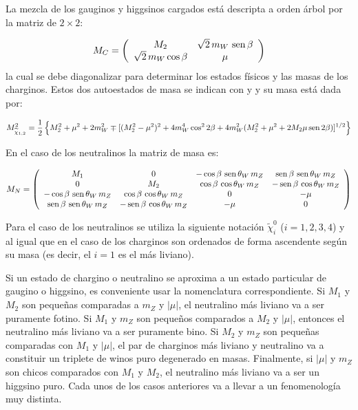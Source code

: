 \begin{itemize}
La mezcla de los gauginos y higgsinos cargados está descripta a orden árbol por la matriz de $2\times 2$:

\begin{equation}
  M_{C} = \left(
  \begin{array}{cc}
      M_2               & {\sqrt{2}} \, m_{W} \, \operatorname{sen} \beta  \\
      \sqrt{2} \, m_W \cos \beta  & \mu
  \end{array}
  \right)
\end{equation}
%
la cual se debe diagonalizar para determinar los estados físicos y las masas de los charginos.
Estos dos autoestados de masa se indican con {\chinoonepm} y
{\chinotwopm} y su masa está dada por:

\begin{equation}
  M^2_{\widetilde{\chi}_{1,2}} = \frac{1}{2} \left\{ M_2^2 + \mu^2 + 2 m_W^2 \mp
  [(M_2^2-\mu^2)^2 + 4 m_W^4 \cos^2 2\beta + 4 m_W^2 (M_2^2+\mu^2 + 2 M_2 \mu \operatorname{sen}
    2\beta)]^{1/2} \right\}
\end{equation}


En el caso de los neutralinos la matriz de masa es:

\begin{equation}
  M_{N} = \left(
  \begin{array}{cccc}
    M_1 & 0 & - \cos\beta \, \operatorname{sen}\theta_W \, m_Z & \operatorname{sen}\beta \, \operatorname{sen}\theta_W \, m_Z \\
    0 & M_2 & \cos\beta \, \cos\theta_W \, m_Z & -\operatorname{sen}\beta \, \cos\theta_W \, m_Z \\
    - \cos\beta \, \operatorname{sen}\theta_W \, m_Z & \cos\beta \, \cos\theta_W  \,m_Z & 0 & -\mu \\
    \operatorname{sen}\beta \, \operatorname{sen}\theta_W \, m_Z & -\operatorname{sen}\beta \, \cos\theta_W \, m_Z & -\mu & 0 \\
  \end{array}
  \right)
\end{equation}

Para el caso de los neutralinos se utiliza la siguiente notación $\tilde{\chi}^0_{i}$ ($i=1,2,3,4$)
y al igual que en el caso de los charginos son ordenados de forma ascendente según su masa (es decir,
el $i=1$ es el más liviano).

Si un estado de chargino o neutralino se aproxima a un estado particular de
gaugino o higgsino, es conveniente usar la nomenclatura correspondiente. Si
$M_1$ y $M_2$ son pequeñas comparadas a $m_Z$ y $|\mu|$, el neutralino más
liviano va a ser puramente fotino. Si $M_1$ y $m_Z$ son pequeños comparados a
$M_2$ y $|\mu|$, entonces el neutralino más liviano va a ser puramente bino. Si
$M_2$ y $m_Z$ son pequeñas comparadas con $M_1$ y $|\mu|$, el par de charginos
más liviano y neutralino va a constituir un triplete de winos puro degenerado en
masas. Finalmente, si $|\mu|$ y $m_Z$ son chicos comparados con $M_1$ y $M_2$,
el neutralino más liviano va a ser un higgsino puro. Cada unos de los casos
anteriores va a llevar a un fenomenología muy distinta.



\end{itemize}

